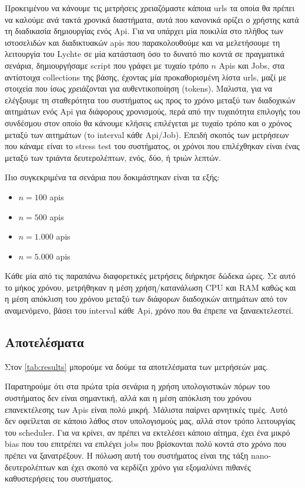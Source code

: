 Προκειμένου να κάνουμε τις μετρήσεις χρειαζόμαστε κάποια urls τα οποία θα πρέπει να καλούμε ανά τακτά χρονικά διαστήματα, αυτά που κανονικά ορίζει ο χρήστης
κατά τη διαδικασία δημιουργίας ενός Api. Για να υπάρχει μία ποικιλία στο πλήθος των ιστοσελιδών και διαδικτυακών apis που παρακολουθούμε και να μελετήσουμε τη λειτουργία του Lychte σε
μία κατάσταση όσο το δυνατό πιο κοντά σε πραγματικά σενάρια, δημιουργήσαμε script που γράφει με τυχαίο τρόπο $n$ Apis και Jobs, στα αντίστοιχα collections της βάσης, έχοντας μία προκαθορισμένη
λίστα urls, μαζί με στοιχεία που ίσως χρειάζονται για αυθεντικοποίηση (tokens). Μαλιστα, για να ελέγξουμε τη σταθερότητα του συστήματος ως προς
το χρόνο μεταξύ των διαδοχικών αιτημάτων ενός Api για διάφορους χρονισμούς, περά από την τυχαιότητα επιλογής του συνδέσμου στον οποίο θα κάνουμε κλήσεις
επιλέγεται με τυχαίο τρόπο και ο χρόνος μεταξύ των αιτημάτων (τo interval κάθε Αpi/Job). Επειδή σκοπός των μετρήσεων που κάναμε είναι
το stress test του συστήματος, οι χρόνοι που επιλέχθηκαν είναι ένας μεταξύ των τριάντα δευτερολέπτων, ενός, δύο, ή τριών λεπτών.

Πιο συγκεκριμένα τα σενάρια που δοκιμάστηκαν είναι τα εξής:
\begin{itemize}
	\item $n = 100$ apis
	\item $n = 500$ apis
	\item $n = 1.000$ apis
	\item $n = 5.000$ apis
\end{itemize}

Κάθε μία από τις παραπάνω διαφορετικές μετρήσεις διήρκησε δώδεκα ώρες. Σε αυτό το μήκος χρόνου, 
μετρήθηκαν η μέση χρήση/κατανάλωση CPU και RAM καθώς και η μέση απόκλιση του χρόνου μεταξύ των διάφορων διαδοχικών αιτημάτων
από τον αναμενόμενο, βάσει του interval κάθε Αpi, χρόνο που θα έπρεπε να ξαναεκτελεστεί. 

\subsection{Αποτελέσματα}
\label{subsection:experiment_results}

Στον \autoref{tab:results} μπορούμε να δούμε τα αποτελέσματα των μετρήσεών μας.

Παρατηρούμε ότι στα πρώτα τρία σενάρια η χρήση υπολογιστικών πόρων του συστήματος δεν είναι σημαντική, αλλά
και η μέση απόκλιση του χρόνου επανεκτέλεσης των Apis είναι πολύ μικρή. Μάλιστα παίρνει αρνητικές τιμές. Αυτό δεν οφείλεται σε κάποιο
λάθος στον υπολογισμούς μας, αλλά στον τρόπο λειτουργίας του scheduler. Για να κρίνει, αν πρέπει να εκτελέσει κάποιο αίτημα, έχει ένα μικρό bias
που του επιτρέπει να επιλέγει jobs που βρίσκονται πολύ κοντά στο χρόνο που πρέπει να ξανατρέξουν. H πόλωση αυτή του συστήματος είναι της τάξη
nano-δευτερολέπτων και έχει σκοπό να κερδίζει χρόνο για εξομαλύνει πιθανές καθυστερήσεις του συστήματος.  

